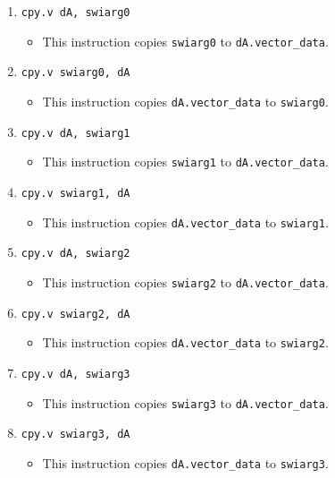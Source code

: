 \documentclass{article}
\begin{document}
\begin{itemize}
\begin{enumerate}
			\item \texttt{cpy.v dA, swiarg0}
				\begin{itemize}
				\item This instruction copies \texttt{swiarg0} to
					\texttt{dA.vector\_data}.
				\end{itemize}
			\item \texttt{cpy.v swiarg0, dA}
				\begin{itemize}
				\item This instruction copies \texttt{dA.vector\_data} to
					\texttt{swiarg0}.
				\end{itemize}
			\item \texttt{cpy.v dA, swiarg1}
				\begin{itemize}
				\item This instruction copies \texttt{swiarg1} to
					\texttt{dA.vector\_data}.
				\end{itemize}
			\item \texttt{cpy.v swiarg1, dA}
				\begin{itemize}
				\item This instruction copies \texttt{dA.vector\_data} to
					\texttt{swiarg1}.
				\end{itemize}

			\item \texttt{cpy.v dA, swiarg2}
				\begin{itemize}
				\item This instruction copies \texttt{swiarg2} to
					\texttt{dA.vector\_data}.
				\end{itemize}
			\item \texttt{cpy.v swiarg2, dA}
				\begin{itemize}
				\item This instruction copies \texttt{dA.vector\_data} to
					\texttt{swiarg2}.
				\end{itemize}
			\item \texttt{cpy.v dA, swiarg3}
				\begin{itemize}
				\item This instruction copies \texttt{swiarg3} to
					\texttt{dA.vector\_data}.
				\end{itemize}
			\item \texttt{cpy.v swiarg3, dA}
				\begin{itemize}
				\item This instruction copies \texttt{dA.vector\_data} to
					\texttt{swiarg3}.
				\end{itemize}


\end{enumerate}
\end{itemize}
\end{document}
